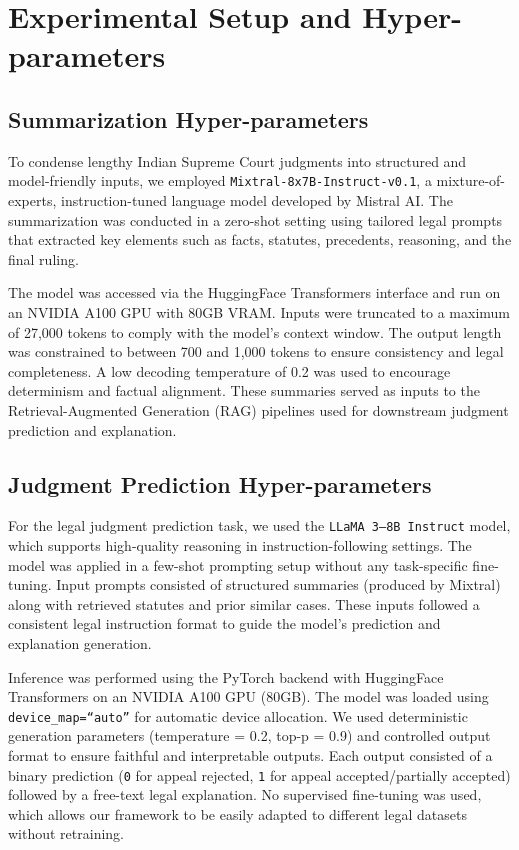 \section{Experimental Setup and Hyper-parameters}
\label{sec:Experimental-setup}
\subsection{Summarization Hyper-parameters}
To condense lengthy Indian Supreme Court judgments into structured and model-friendly inputs, we employed \texttt{Mixtral-8x7B-Instruct-v0.1}, a mixture-of-experts, instruction-tuned language model developed by Mistral AI. The summarization was conducted in a zero-shot setting using tailored legal prompts that extracted key elements such as facts, statutes, precedents, reasoning, and the final ruling.

The model was accessed via the HuggingFace Transformers interface and run on an NVIDIA A100 GPU with 80GB VRAM. Inputs were truncated to a maximum of 27,000 tokens to comply with the model’s context window. The output length was constrained to between 700 and 1,000 tokens to ensure consistency and legal completeness. A low decoding temperature of 0.2 was used to encourage determinism and factual alignment. These summaries served as inputs to the Retrieval-Augmented Generation (RAG) pipelines used for downstream judgment prediction and explanation.

\subsection{Judgment Prediction Hyper-parameters}
For the legal judgment prediction task, we used the \texttt{LLaMA 3–8B Instruct} model, which supports high-quality reasoning in instruction-following settings. The model was applied in a few-shot prompting setup without any task-specific fine-tuning. Input prompts consisted of structured summaries (produced by Mixtral) along with retrieved statutes and prior similar cases. These inputs followed a consistent legal instruction format to guide the model's prediction and explanation generation.

Inference was performed using the PyTorch backend with HuggingFace Transformers on an NVIDIA A100 GPU (80GB). The model was loaded using \texttt{device\_map=``auto''} for automatic device allocation. We used deterministic generation parameters (temperature = 0.2, top-p = 0.9) and controlled output format to ensure faithful and interpretable outputs. Each output consisted of a binary prediction (\texttt{0} for appeal rejected, \texttt{1} for appeal accepted/partially accepted) followed by a free-text legal explanation. No supervised fine-tuning was used, which allows our framework to be easily adapted to different legal datasets without retraining.

